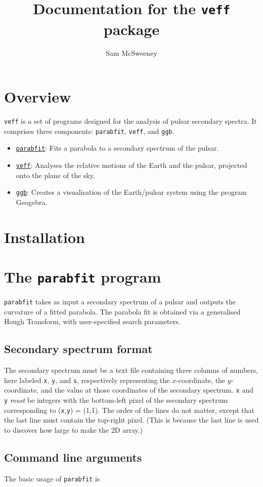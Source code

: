 \documentclass{article}
\title{Documentation for the \texttt{veff} package}
\author{Sam McSweeney}
\newcommand{\veff}{\texttt{veff}}
\newcommand{\parabfit}{\texttt{parabfit}}
\newcommand{\ggb}{\texttt{ggb}}
\newcommand{\x}{\texttt{x}}
\newcommand{\y}{\texttt{y}}
\newcommand{\s}{\texttt{s}}
\begin{document}
\maketitle

\section{Overview}

\veff{} is a set of programs designed for the analysis of pulsar secondary spectra.
It comprises three components: \parabfit{}, \veff{}, and \ggb{}.
\begin{itemize}
    \item \underline{\parabfit}: Fits a parabola to a secondary spectrum of the pulsar.
    \item \underline{\veff}: Analyses the relative motions of the Earth and the pulsar, projected onto the plane of the sky.
    \item \underline{\ggb}: Creates a visualisation of the Earth/pulsar system using the program Geogebra.
\end{itemize}

\section{Installation}

\section{The \parabfit{} program}

\parabfit{} takes as input a secondary spectrum of a pulsar and outputs the curvature of a fitted parabola.
The parabola fit is obtained via a generalised Hough Transform, with user-specified search parameters.

\subsection{Secondary spectrum format}

The secondary spectrum must be a text file containing three columns of numbers, here labeled \x{}, \y{}, and \s{}, respectively representing the $x$-coordinate, the $y$-coordinate, and the value at those coordinates of the secondary spectrum.
\x{} and \y{} \emph{must} be integers with the bottom-left pixel of the secondary spectrum corresponding to (\x{},\y{}) = (1,1).
The order of the lines do not matter, except that the last line must contain the top-right pixel.
(This is because the last line is used to discover how large to make the 2D array.)

\subsection{Command line arguments}

The basic usage of \parabfit{} is
\end{document}
